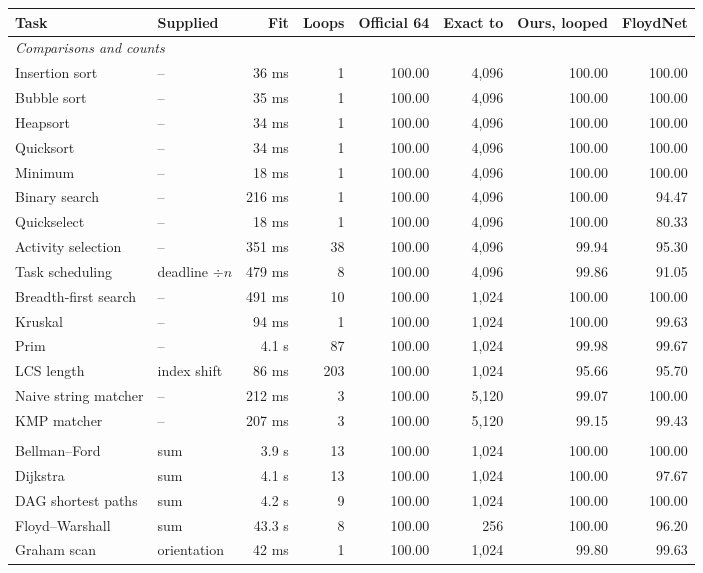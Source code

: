 \begin{tabular}{llrrrrrr}\toprule
Task & Supplied & Fit & Loops & Official 64 & Exact to & Ours, looped & FloydNet \\\midrule
\multicolumn{8}{l}{\textit{Comparisons and counts}} \\
Insertion sort & -- & 36 ms & 1 & 100.00 & 4,096 & 100.00 & 100.00 \\
Bubble sort & -- & 35 ms & 1 & 100.00 & 4,096 & 100.00 & 100.00 \\
Heapsort & -- & 34 ms & 1 & 100.00 & 4,096 & 100.00 & 100.00 \\
Quicksort & -- & 34 ms & 1 & 100.00 & 4,096 & 100.00 & 100.00 \\
Minimum & -- & 18 ms & 1 & 100.00 & 4,096 & 100.00 & 100.00 \\
Binary search & -- & 216 ms & 1 & 100.00 & 4,096 & 100.00 & 94.47 \\
Quickselect & -- & 18 ms & 1 & 100.00 & 4,096 & 100.00 & 80.33 \\
Activity selection & -- & 351 ms & 38 & 100.00 & 4,096 & 99.94 & 95.30 \\
Task scheduling & deadline $\div n$ & 479 ms & 8 & 100.00 & 4,096 & 99.86 & 91.05 \\
Breadth-first search & -- & 491 ms & 10 & 100.00 & 1,024 & 100.00 & 100.00 \\
Kruskal & -- & 94 ms & 1 & 100.00 & 1,024 & 100.00 & 99.63 \\
Prim & -- & 4.1 s & 87 & 100.00 & 1,024 & 99.98 & 99.67 \\
LCS length & index shift & 86 ms & 203 & 100.00 & 1,024 & 95.66 & 95.70 \\
Naive string matcher & -- & 212 ms & 3 & 100.00 & 5,120 & 99.07 & 100.00 \\
KMP matcher & -- & 207 ms & 3 & 100.00 & 5,120 & 99.15 & 99.43 \\
\addlinespace[2pt]
\multicolumn{8}{l}{\textit{One arithmetic primitive supplied}} \\
Bellman--Ford & sum & 3.9 s & 13 & 100.00 & 1,024 & 100.00 & 100.00 \\
Dijkstra & sum & 4.1 s & 13 & 100.00 & 1,024 & 100.00 & 97.67 \\
DAG shortest paths & sum & 4.2 s & 9 & 100.00 & 1,024 & 100.00 & 100.00 \\
Floyd--Warshall & sum & 43.3 s & 8 & 100.00 & 256 & 100.00 & 96.20 \\
Graham scan & orientation & 42 ms & 1 & 100.00 & 1,024 & 99.80 & 99.63 \\

\end{tabular}
